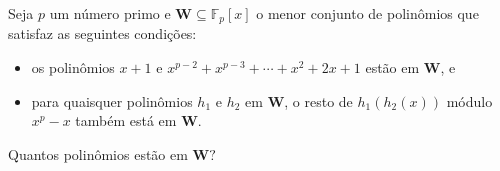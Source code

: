 Seja \(p\) um número primo e \(\mathbf{W}\subseteq \mathbb{F}_p[x]\) o menor conjunto de polinômios que satisfaz as seguintes condições:
\begin{itemize}
  \item os polinômios \(x+1\) e \(x^{p-2}+x^{p-3}+\cdots +x^2+2x+1\) estão em \(\mathbf{W}\), e
  \item para quaisquer polinômios \(h_1\) e \(h_2\) em \(\mathbf{W}\), o resto de \(h_1(h_2(x))\) módulo \(x^p-x\) também está em \(\mathbf{W}\).
\end{itemize}
Quantos polinômios estão em \(\mathbf{W}?\)
